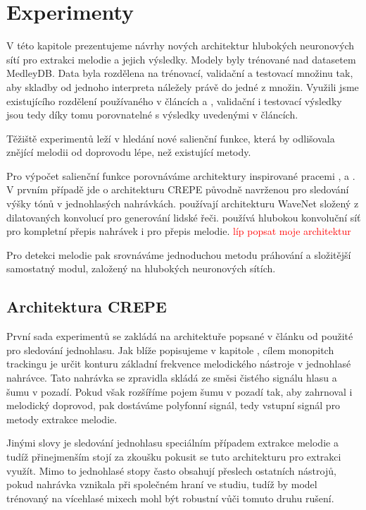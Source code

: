 \chapter{Experimenty}\label{experimenty}

V této kapitole prezentujeme návrhy nových architektur hlubokých neuronových sítí pro extrakci melodie a jejich výsledky. Modely byly trénované nad datasetem MedleyDB. Data byla rozdělena na trénovací, validační a testovací množinu tak, aby skladby od jednoho interpreta náležely právě do jedné z množin. Využili jsme existujícího rozdělení používaného v článcích \cite{Bittner2017} a \cite{DBasaranSEssid2018}, validační i testovací výsledky jsou tedy díky tomu porovnatelné s výsledky uvedenými v článcích.

Těžiště experimentů leží v hledání nové salienční funkce, která by odlišovala znějící melodii od doprovodu lépe, než existující metody.

Pro výpočet salienční funkce porovnáváme architektury inspirované pracemi \cite{Kim2018}, \cite{Oord2016} a \cite{Bittner2017}. V prvním případě jde o architekturu CREPE původně navrženou pro sledování výšky tónů v jednohlasých nahrávkách. \cite{Oord2016} používají architekturu WaveNet složený z dilatovaných konvolucí pro generování lidské řeči. \cite{Bittner2017} používá hlubokou konvoluční síť pro kompletní přepis nahrávek i pro přepis melodie. 
\textcolor{red}{líp popsat moje architektur}

Pro detekci melodie pak srovnáváme jednoduchou metodu práhování a složitější samostatný modul, založený na hlubokých neuronových sítích.

\section{Architektura CREPE}\label{sec:crepe}

První sada experimentů se zakládá na architektuře popsané v článku od \cite{Kim2018} použité pro sledování jednohlasu. Jak blíže popisujeme v kapitole , cílem monopitch trackingu je určit konturu základní frekvence melodického nástroje v jednohlasé nahrávce. Tato nahrávka se zpravidla skládá ze směsi čistého signálu hlasu a šumu v pozadí. Pokud však rozšíříme pojem šumu v pozadí tak, aby zahrnoval i melodický doprovod, pak dostáváme polyfonní signál, tedy vstupní signál pro metody extrakce melodie.

Jinými slovy je sledování jednohlasu speciálním případem extrakce melodie a tudíž přinejmenším stojí za zkoušku pokusit se tuto architekturu pro extrakci využít. Mimo to jednohlasé stopy často obsahují přeslech ostatních nástrojů, pokud nahrávka vznikala při společném hraní ve studiu, tudíž by model trénovaný na vícehlasé mixech mohl být robustní vůči tomuto druhu rušení. 

